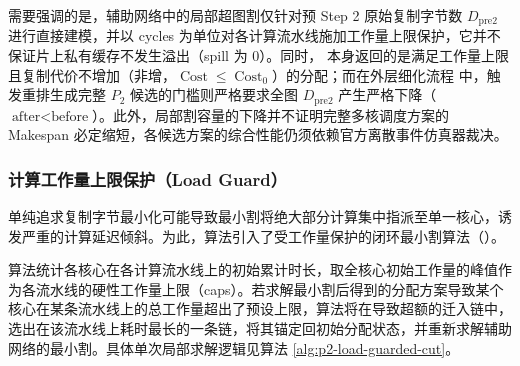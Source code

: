 \documentclass[anonymous,notoc]{gmcm2026}
\begin{document}
需要强调的是，辅助网络中的局部超图割仅针对预 Step 2 原始复制字节数 \(D_{\mathrm{pre2}}\) 进行直接建模，并以 cycles 为单位对各计算流水线施加工作量上限保护，它并不保证片上私有缓存不发生溢出（spill 为 0）。同时，\texttt{} 本身返回的是满足工作量上限且复制代价不增加（非增，\(\operatorname{Cost} \le \operatorname{Cost}_0\)）的分配；而在外层细化流程 \texttt{} 中，触发重排生成完整 \(P_2\) 候选的门槛则严格要求全图 \(D_{\mathrm{pre2}}\) 产生严格下降（\(\text{after} < \text{before}\)）。此外，局部割容量的下降并不证明完整多核调度方案的 Makespan 必定缩短，各候选方案的综合性能仍须依赖官方离散事件仿真器裁决。

\subsubsection{计算工作量上限保护（Load Guard）}

单纯追求复制字节最小化可能导致最小割将绝大部分计算集中指派至单一核心，诱发严重的计算延迟倾斜。为此，算法引入了受工作量保护的闭环最小割算法（\texttt{}）。

算法统计各核心在各计算流水线上的初始累计时长，取全核心初始工作量的峰值作为各流水线的硬性工作量上限（caps）。若求解最小割后得到的分配方案导致某个核心在某条流水线上的总工作量超出了预设上限，算法将在导致超额的迁入链中，选出在该流水线上耗时最长的一条链，将其锚定回初始分配状态，并重新求解辅助网络的最小割。具体单次局部求解逻辑见算法 \ref{alg:p2-load-guarded-cut}。
\end{document}
